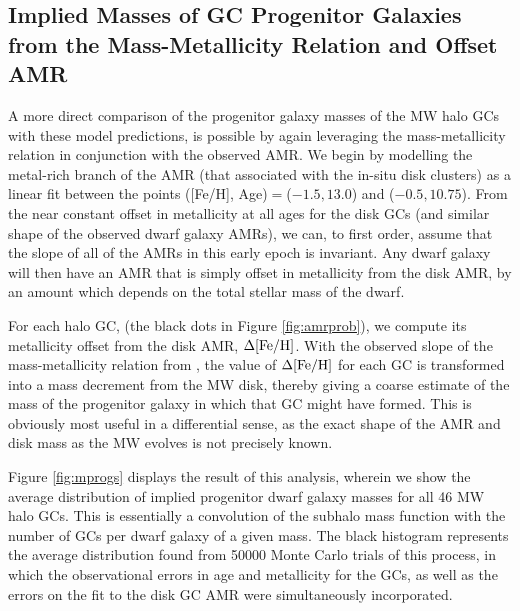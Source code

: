 \documentclass[useAMS,usenatbib]{mn2e}
\begin{document}
\subsection{Implied Masses of GC Progenitor Galaxies from the Mass-Metallicity Relation
and Offset AMR}
A more direct comparison of the progenitor galaxy masses of the MW halo
GCs with these model predictions, is possible by
again leveraging the mass-metallicity
relation in conjunction with the observed AMR.  We begin by modelling the 
metal-rich branch of the AMR (that associated with the in-situ disk clusters)
as a linear fit between the points ([Fe/H], Age)$ = $($-1.5, 13.0$) and ($-0.5,
10.75$).  From the near constant offset in metallicity at all ages for the disk
GCs (and similar shape of the observed dwarf galaxy AMRs), 
we can, to first order, assume that the slope of all of the AMRs in this
early epoch is invariant.  Any dwarf galaxy will then have an AMR that is simply
offset in metallicity from the disk AMR, by an amount which depends on the
total stellar mass of the dwarf.  

For each halo GC, (the black dots in Figure \ref{fig:amrprob}), we compute its
metallicity offset from the disk AMR, $\Delta\rm{[Fe/H]}$.  With the observed
slope of the mass-metallicity relation from \cite{Kirby11}, the value of
$\Delta\rm{[Fe/H]}$ for each GC is transformed into a mass decrement from the
MW disk, thereby giving a coarse estimate of the mass of the progenitor galaxy
in which that GC might have formed.  This is obviously most useful in a differential
sense, as the exact shape of the AMR and disk mass as the MW evolves is not precisely
known.

Figure \ref{fig:mprogs} displays the result of this analysis, wherein
we show the average distribution of implied progenitor dwarf galaxy masses for all 46 MW halo
GCs.  This is essentially a convolution of the subhalo mass function with the 
number of GCs per dwarf galaxy of a given mass. The black histogram represents the 
average distribution found from 50000 Monte Carlo trials of this process, in which
the observational errors in age and metallicity for the GCs, as well as the errors
on the fit to the disk GC AMR were simultaneously incorporated.
\end{document}
